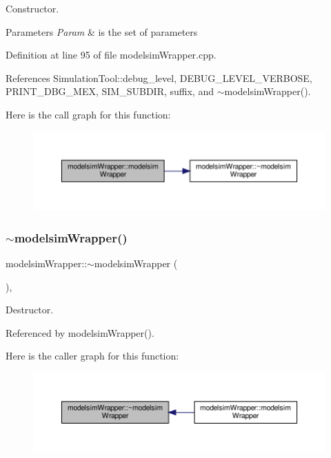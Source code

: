 Constructor. 


\begin{DoxyParams}{Parameters}
{\em Param} & is the set of parameters \\
\hline
\end{DoxyParams}


Definition at line 95 of file modelsim\+Wrapper.\+cpp.



References Simulation\+Tool\+::debug\+\_\+level, D\+E\+B\+U\+G\+\_\+\+L\+E\+V\+E\+L\+\_\+\+V\+E\+R\+B\+O\+SE, P\+R\+I\+N\+T\+\_\+\+D\+B\+G\+\_\+\+M\+EX, S\+I\+M\+\_\+\+S\+U\+B\+D\+IR, suffix, and $\sim$modelsim\+Wrapper().

Here is the call graph for this function\+:
\nopagebreak
\begin{figure}[H]
\begin{center}
\leavevmode
\includegraphics[width=350pt]{d1/d7f/classmodelsimWrapper_aa5ea5e63c543de87a906a0a306967388_cgraph}
\end{center}
\end{figure}
\mbox{\label{classmodelsimWrapper_a37da7aca21cf9be213b913ed870ea8ae}} 
\subsubsection{\texorpdfstring{$\sim$modelsim\+Wrapper()}{~modelsimWrapper()}}
{\footnotesize\ttfamily modelsim\+Wrapper\+::$\sim$modelsim\+Wrapper (\begin{DoxyParamCaption}{ }\end{DoxyParamCaption})\hspace{0.3cm}{\ttfamily [override]}, {\ttfamily [default]}}



Destructor. 



Referenced by modelsim\+Wrapper().

Here is the caller graph for this function\+:
\nopagebreak
\begin{figure}[H]
\begin{center}
\leavevmode
\includegraphics[width=350pt]{d1/d7f/classmodelsimWrapper_a37da7aca21cf9be213b913ed870ea8ae_icgraph}
\end{center}
\end{figure}


